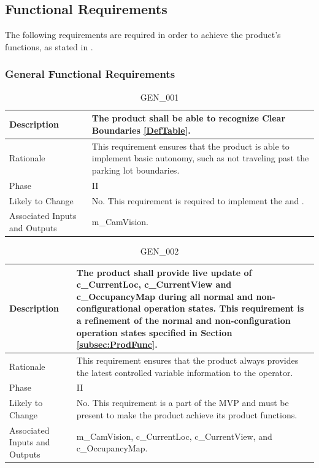 \documentclass{article}
\begin{document}
\newpage

\subsection{Functional Requirements}
\label{sec:funcReqs}
The following requirements are required in order to achieve the product's functions, as stated in .

\subsubsection{General Functional Requirements}

\begin{table}[!h]
\begin{center}
\caption {GEN\_001} 
\label{GEN_001}
\begin{tabular}{ | m{3cm} | m{11cm} | }
\hline
Description & The product shall be able to recognize Clear Boundaries \ref{DefTable}.  \\
\hline
Rationale & This requirement ensures that the product is able to implement basic autonomy, such as not traveling past the parking lot boundaries. \\
\hline
Phase & II \\
\hline
Likely to Change & No. This requirement is required to implement the \nameref{Autonomous Explore State} and \nameref{Compulsive Move State}. \\
\hline
Associated Inputs and Outputs & m\_CamVision. \\
\hline
\end{tabular}
\end{center}
\end{table}


\begin{table}[!h]
\begin{center}
\caption {GEN\_002} 
\label{GEN_002}
\begin{tabular}{ | m{3cm} | m{11cm} | } 
\hline
Description & The product shall provide live update of c\_CurrentLoc, c\_CurrentView and c\_OccupancyMap during all normal and non-configurational operation states. This requirement is a refinement of the normal and non-configuration operation states specified in Section \ref{subsec:ProdFunc}. \\
\hline
Rationale & This requirement ensures that the product always provides the latest controlled variable information to the operator. \\
\hline
Phase & II \\
\hline
Likely to Change & No. This requirement is a part of the MVP and must be present to make the product achieve its product functions. \\
\hline
Associated Inputs and Outputs & m\_CamVision, c\_CurrentLoc, c\_CurrentView, and c\_OccupancyMap. \\
\hline
\end{tabular}
\end{center}
\end{table}
\end{document}
